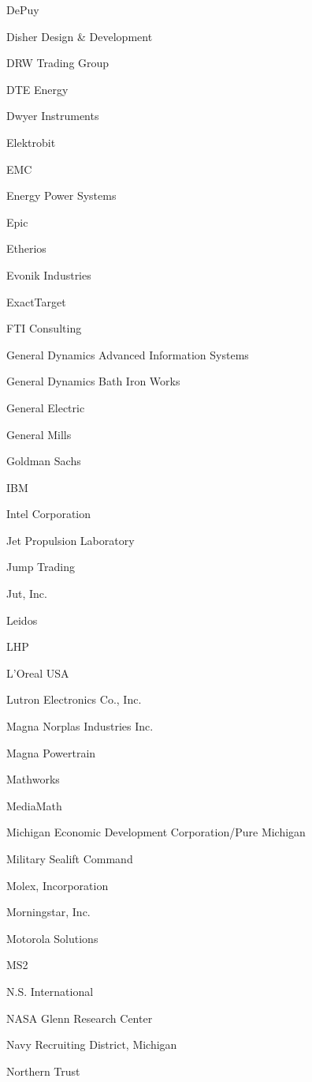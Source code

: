 \documentclass[twoside]{article}
\begin{document}
\begin{center}
\begin{multicols}{5}
\begin{FlushLeft}
\begin{compactitem}
\item DePuy
\item Disher Design \& Development
\item DRW Trading Group
\item DTE Energy
\item Dwyer Instruments
\item Elektrobit
\item EMC
\item Energy Power Systems
\item Epic
\item Etherios
\item Evonik Industries
\item ExactTarget
\item FTI Consulting
\item General Dynamics Advanced Information Systems
\item General Dynamics Bath Iron Works
\item General Electric
\item General Mills
\item Goldman Sachs
\item IBM
\item Intel Corporation
\item Jet Propulsion Laboratory
\item Jump Trading
\item Jut, Inc.
\item Leidos
\item LHP
\item L'Oreal USA
\item Lutron Electronics Co., Inc.
\item Magna Norplas Industries Inc.
\item Magna Powertrain
\item Mathworks
\item MediaMath
\item Michigan Economic Development Corporation/Pure Michigan
\item Military Sealift Command
\item Molex, Incorporation
\item Morningstar, Inc.
\item Motorola Solutions
\item MS2
\item N.S. International
\item NASA Glenn Research Center
\item Navy Recruiting District, Michigan
\item Northern Trust

\end{compactitem}
\end{FlushLeft}
\end{multicols}
\end{center}
\end{document}
